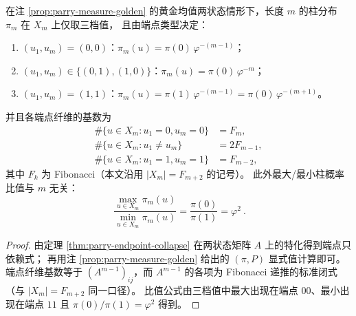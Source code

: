 \begin{corollary}\label{cor:parry-golden-three-levels}
在注 \ref{prop:parry-measure-golden} 的黄金均值两状态情形下，长度 \(m\) 的柱分布 \(\pi_m\) 在 \(X_m\) 上仅取三档值，
且由端点类型决定：
\begin{enumerate}
  \item \((u_1,u_m)=(0,0)\)：\(\pi_m(u)=\pi(0)\,\varphi^{-(m-1)}\)；
  \item \((u_1,u_m)\in\{(0,1),(1,0)\}\)：\(\pi_m(u)=\pi(0)\,\varphi^{-m}\)；
  \item \((u_1,u_m)=(1,1)\)：\(\pi_m(u)=\pi(1)\,\varphi^{-(m-1)}=\pi(0)\,\varphi^{-(m+1)}\)。
\end{enumerate}
并且各端点纤维的基数为
\[
\begin{aligned}
\#\{u\in X_m:u_1=0,u_m=0\}&=F_m,\\
\#\{u\in X_m:u_1\neq u_m\}&=2F_{m-1},\\
\#\{u\in X_m:u_1=1,u_m=1\}&=F_{m-2},
\end{aligned}
\]
其中 \(F_k\) 为 Fibonacci（本文沿用 \(|X_m|=F_{m+2}\) 的记号）。
此外最大/最小柱概率比值与 \(m\) 无关：
\[
\boxed{\ \frac{\max_{u\in X_m}\pi_m(u)}{\min_{u\in X_m}\pi_m(u)}=\frac{\pi(0)}{\pi(1)}=\varphi^2\ }.
\]
\end{corollary}
\begin{proof}
由定理 \ref{thm:parry-endpoint-collapse} 在两状态矩阵 \(A\) 上的特化得到端点只依赖式；
再用注 \ref{prop:parry-measure-golden} 给出的 \((\pi,P)\) 显式值计算即可。
端点纤维基数等于 \((A^{m-1})_{ij}\)，而 \(A^{m-1}\) 的各项为 Fibonacci 递推的标准闭式（与 \(|X_m|=F_{m+2}\) 同一口径）。
比值公式由三档值中最大出现在端点 \(00\)、最小出现在端点 \(11\) 且 \(\pi(0)/\pi(1)=\varphi^2\) 得到。
\end{proof}

